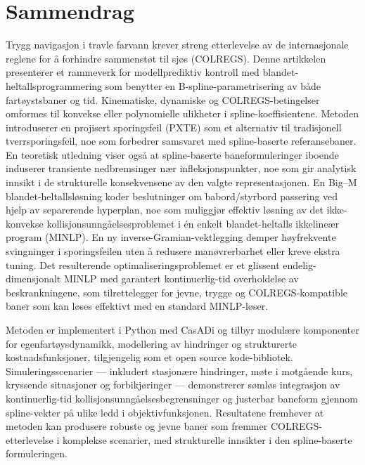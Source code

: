 \cleardoublepage

\section*{Sammendrag}
\vspace{0.5cm}

Trygg navigasjon i travle farvann krever streng etterlevelse av de internasjonale reglene for å forhindre sammenstøt til sjøs (COLREGS).
Denne artikkelen presenterer et rammeverk for modellprediktiv kontroll med blandet-heltallsprogrammering som benytter en B-spline-parametrisering av både fartøystsbaner og tid. Kinematiske, dynamiske og COLREGS-betingelser omformes til konvekse eller polynomielle ulikheter i spline-koeffisientene.
Metoden introduserer en projisert sporingsfeil (PXTE) som et alternativ til tradisjonell tverrsporingsfeil, noe som forbedrer samsvaret med spline-baserte referansebaner. En teoretisk utledning viser også at spline-baserte baneformuleringer iboende induserer transiente nedbremsinger nær infleksjonspunkter, noe som gir analytisk innsikt i de strukturelle konsekvensene av den valgte representasjonen.
En Big–M blandet-heltallsløsning koder beslutninger om babord/styrbord passering ved hjelp av separerende hyperplan, noe som muliggjør effektiv løsning av det ikke-konvekse kollisjonsunngåelsesproblemet i én enkelt blandet-heltalls ikkelineær program (MINLP).
En ny inverse-Gramian-vektlegging demper høyfrekvente svingninger i sporingsfeilen uten å redusere manøvrerbarhet eller kreve ekstra tuning. Det resulterende optimaliseringsproblemet er et glissent endelig-dimensjonalt MINLP med garantert kontinuerlig-tid overholdelse av beskrankningene, som tilrettelegger for jevne, trygge og COLREGS-kompatible baner som kan løses effektivt med en standard MINLP-løser.

Metoden er implementert i Python med CasADi og tilbyr modulære komponenter for egenfartøysdynamikk, modellering av hindringer og strukturerte kostnadsfunksjoner, tilgjengelig som et open source kode-bibliotek. Simuleringsscenarier — inkludert stasjonære hindringer, møte i motgående kurs, kryssende situasjoner og forbikjøringer — demonstrerer sømløs integrasjon av kontinuerlig-tid kollisjonsunngåelsesbegrensninger og justerbar baneform gjennom spline-vekter på ulike ledd i objektivfunksjonen. Resultatene fremhever at metoden kan produsere robuste og jevne baner som fremmer COLREGS-etterlevelse i komplekse scenarier, med strukturelle innsikter i den spline-baserte formuleringen.

\cleardoublepage